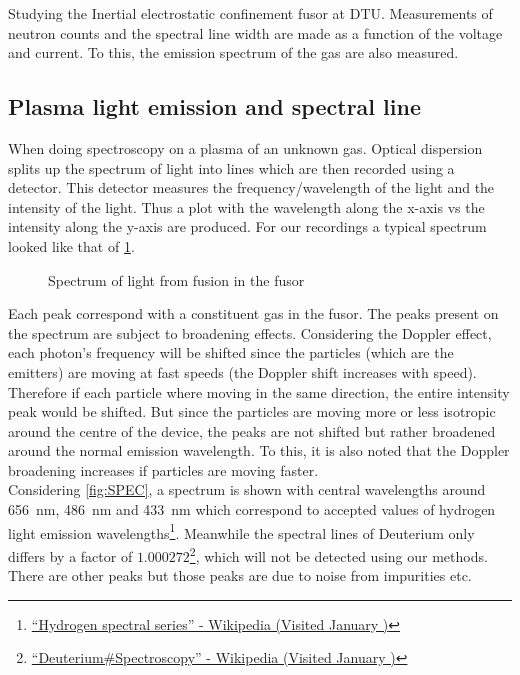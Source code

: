 Studying the Inertial electrostatic confinement fusor at DTU. Measurements of neutron counts and the spectral line width are made as a function of the voltage and current. To this, the emission spectrum of the gas are also measured.
\subsection{Plasma light emission and spectral line}
When doing spectroscopy on a plasma of an unknown gas. Optical dispersion splits up the spectrum of light into lines which are then recorded using a detector. This detector measures the frequency/wavelength of the light and the intensity of the light. Thus a plot with the wavelength along the x-axis vs the intensity along the y-axis are produced. For our recordings a typical spectrum looked like that of \cref{SPEC}.
\begin{figure}[H]
	\centering
	\caption{Spectrum of light from fusion in the fusor}
	\label{SPEC}
\end{figure}
Each peak correspond with a constituent gas in the fusor.
The peaks present on the spectrum are subject to broadening effects. Considering the Doppler effect, each photon's frequency will be shifted since the particles (which are the emitters) are moving at fast speeds (the Doppler shift increases with speed). Therefore if each particle where moving in the same direction, the entire intensity peak would be shifted. But since the particles are moving more or less isotropic around the centre of the device, the peaks are not shifted but rather broadened around the normal emission wavelength. To this, it is also noted that the Doppler broadening increases if particles are moving faster.\\
Considering \cref{fig:SPEC}, a spectrum is shown with central wavelengths around \SI{656}{\nano\meter}, \SI{486}{\nano\meter} and \SI{433}{\nano\meter} which correspond to accepted values of hydrogen light emission wavelengths\footnote{\href{https://en.wikipedia.org/wiki/Hydrogen_spectral_series}{``Hydrogen spectral series'' - Wikipedia (Visited January )}}. Meanwhile the spectral lines of Deuterium only differs by a factor of $1.000272$\footnote{\href{https://en.wikipedia.org/wiki/Deuterium#Spectroscopy}{``Deuterium\#Spectroscopy'' - Wikipedia (Visited January )}}, which will not be detected using our methods. There are other peaks but those peaks are due to noise from impurities etc.\\
